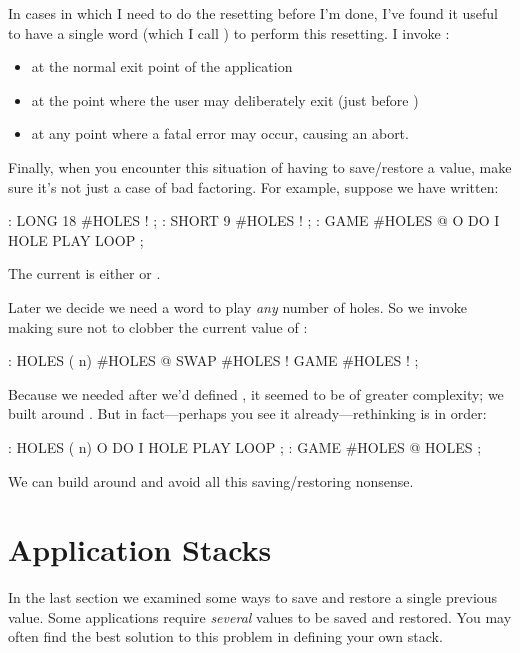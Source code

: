 In cases in which I need to do the resetting before I'm done, I've found it
useful to have a single word (which I call ) to perform this
resetting. I invoke :

\begin{itemize}
\item at the normal exit point of the application
\item at the point where the user may deliberately exit (just before )
\item at any point where a fatal error may occur, causing an abort.
\end{itemize}

Finally, when you encounter this situation of having to save/restore a
value, make sure it's not just a case of bad factoring. For example,
suppose we have written:

\begin{Code}
: LONG   18 #HOLES ! ;
: SHORT   9 #HOLES ! ;
: GAME   #HOLES @  O DO  I HOLE PLAY  LOOP ;
\end{Code}
The current  is either  or .

Later we decide we need a word to play \emph{any} number of holes. So
we invoke  making sure not to clobber the current value of
:

\begin{Code}
: HOLES  ( n)  #HOLES @  SWAP #HOLES !  GAME  #HOLES ! ;
\end{Code}
Because we needed  after we'd defined , it
seemed to be of greater complexity; we built  around
. But in fact---perhaps you see it already---rethinking is
in order:

\begin{Code}
: HOLES ( n)  O DO  I HOLE PLAY  LOOP ;
: GAME   #HOLES @ HOLES ;
\end{Code}
We can build  around  and avoid all this
saving/restoring nonsense.%
%

\section{Application Stacks}

In the last section we examined some ways to save and restore a single
previous value. Some applications require \emph{several} values to be saved and
restored. You may often find the best solution to this problem in defining
your own stack.

